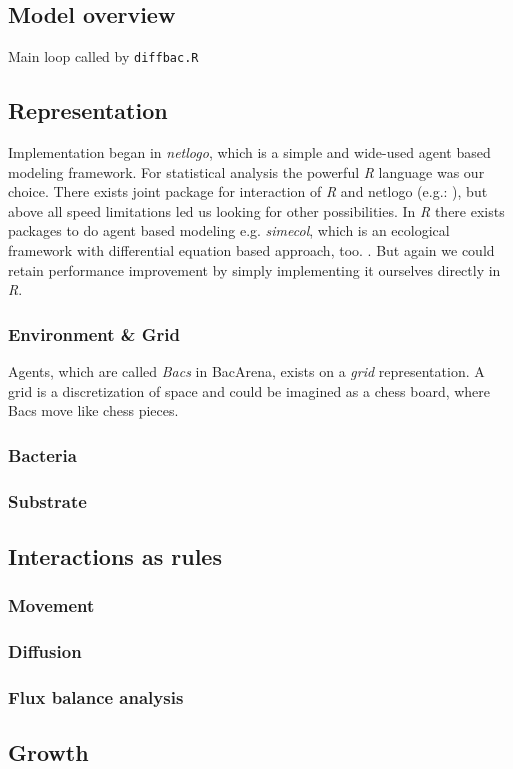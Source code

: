 \subsection{Model overview}

\begin{algorithm}
\SetAlgoLined
{}
\caption{Main loop called by \texttt{diffbac.R}}
\end{algorithm}

\subsection{Representation}
Implementation began in \textit{netlogo}, which is a simple and wide-used agent based modeling framework.\cite{Wilensky1999}
For statistical analysis the powerful \textit{R} language was our choice. 
There exists joint package for interaction of \textit{R} and netlogo (e.g.: \cite{Thiele2010}), but above all speed limitations led us looking for other possibilities.
In \textit{R} there exists packages to do agent based modeling e.g. \textit{simecol}, which is an ecological framework with differential equation based approach, too. \cite{Petzoldt2007}.
But again we could retain performance improvement by simply implementing it ourselves directly in \textit{R}.

\subsubsection{Environment \& Grid}
Agents, which are called \textit{Bacs} in BacArena, exists on a \textit{grid} representation.
A grid is a discretization of space and could be imagined as a chess board, where Bacs move like chess pieces. 

\subsubsection{Bacteria}
\subsubsection{Substrate}

\subsection{Interactions as rules}
\subsubsection{Movement}
\subsubsection{Diffusion}
\subsubsection{Flux balance analysis}

\subsection{Growth}
